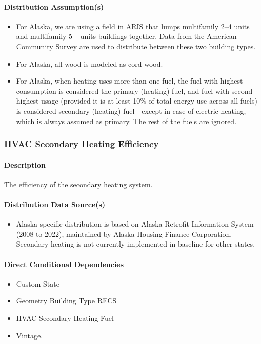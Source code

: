 \paragraph{Distribution Assumption(s)}

\begin{itemize}
    \item For Alaska, we are using a field in ARIS that lumps multifamily 2--4 units and multifamily 5+ units buildings together. Data from the American Community Survey are used to distribute between these two building types.
    \item For Alaska, all wood is modeled as cord wood.
    \item For Alaska, when heating uses more than one fuel, the fuel with highest consumption is considered the primary (heating) fuel, and fuel with second highest usage (provided it is at least 10\% of total energy use across all fuels) is considered secondary (heating) fuel---except in case of electric heating, which is always assumed as primary. The rest of the fuels are ignored.
\end{itemize}
 

\subsubsection{HVAC Secondary Heating Efficiency}
\paragraph{Description}
The efficiency of the secondary heating system.

\paragraph{Distribution Data Source(s)}
\begin{itemize}
\item Alaska-specific distribution is based on Alaska Retrofit Information System (2008 to 2022), maintained by Alaska Housing Finance Corporation. Secondary heating is not currently implemented in baseline for other states.
\end{itemize}
\paragraph{Direct Conditional Dependencies}
\begin{itemize}
    \item Custom State
    \item Geometry Building Type RECS
    \item HVAC Secondary Heating Fuel
    \item Vintage.
\end{itemize}

